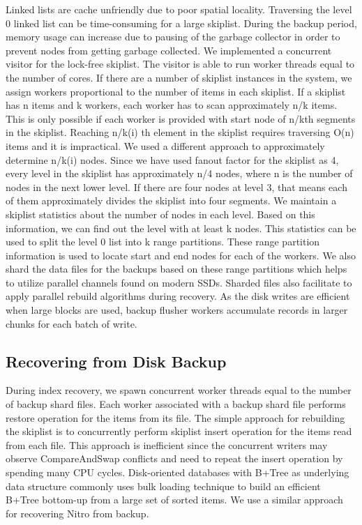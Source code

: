 \documentclass{vldb}
\begin{document}
Linked lists are cache unfriendly due to poor spatial locality. Traversing the level 0 linked list can be time-consuming for a large skiplist. During the backup period, memory usage can increase due to pausing of the garbage collector in order to prevent nodes from getting garbage collected. We implemented a concurrent visitor for the lock-free skiplist. The visitor is able to run worker threads equal to the number of cores. If there are a number of skiplist instances in the system, we assign workers proportional to the number of items in each skiplist. If a skiplist has n items and k workers, each worker has to scan approximately n/k items. This is only possible if each worker is provided with start node of n/kth segments in the skiplist. Reaching n/k(i) th element in the skiplist requires traversing O(n) items and it is impractical. We used a different approach to approximately determine n/k(i) nodes. Since we have used fanout factor for the skiplist as 4, every level in the skiplist has approximately n/4 nodes, where n is the number of nodes in the next lower level. If there are four nodes at level 3, that means each of them approximately divides the skiplist into four segments. We maintain a skiplist statistics about the number of nodes in each level. Based on this information, we can find out the level with at least k nodes. This statistics can be used to split the level 0 list into k range partitions. These range partition information is used to locate start and end nodes for each of the workers. We also shard the data files for the backups based on these range partitions which helps to utilize parallel channels found on modern SSDs. Sharded files also facilitate to apply parallel rebuild algorithms during recovery. As the disk writes are efficient when large blocks are used, backup flusher workers accumulate records in larger chunks for each batch of write.
       
\subsection{Recovering from Disk Backup}
During index recovery, we spawn concurrent worker threads equal to the number of backup shard files.
Each worker associated with a backup shard file performs restore operation for the items from its file. The simple approach for rebuilding the skiplist is to concurrently perform skiplist insert operation for the items read from each file. This approach is inefficient since the concurrent writers may observe CompareAndSwap conflicts and need to repeat the insert operation by spending many CPU cycles. Disk-oriented databases with B+Tree as underlying data structure commonly uses bulk loading technique to build an efficient B+Tree bottom-up from a large set of sorted items. We use a similar approach for recovering Nitro from backup.
\end{document}
